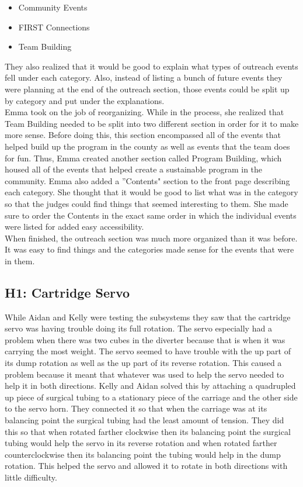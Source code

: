 \documentclass{article}
\begin{document}
\begin{itemize}
    \item Community Events
    \item FIRST Connections
    \item Team Building
\end{itemize}

They also realized that it would be good to explain what types of outreach events fell under each category. Also, instead of listing a bunch of future events they were planning at the end of the outreach section, those events could be split up by category and put under the explanations. \\

Emma took on the job of reorganizing. While in the process, she realized that Team Building needed to be split into two different section in order for it to make more sense. Before doing this, this section encompassed all of the events that helped build up the program in the county as well as events that the team does for fun. Thus, Emma created another section called Program Building, which housed all of the events that helped create a sustainable program in the community. Emma also added a ''Contents" section to the front page describing each category. She thought that it would be good to list what was in the category so that the judges could find things that seemed interesting to them. She made sure to order the Contents in the exact same order in which the individual events were listed for added easy accessibility. \\

When finished, the outreach section was much more organized than it was before. It was easy to find things and the categories made sense for the events that were in them. 
\subsection{H1: Cartridge Servo}

While Aidan and Kelly were testing the subsystems they saw that the cartridge servo was having trouble doing its full rotation. The servo especially had a problem when there was two cubes in the diverter because that is when it was carrying the most weight. The servo seemed to have trouble with the up part of its dump rotation as well as the up part of its reverse rotation. This caused a problem because it meant that whatever was used to help the servo needed to help it in both directions. Kelly and Aidan solved this by attaching a quadrupled up piece of surgical tubing to a stationary piece of the carriage and the other side to the servo horn. They connected it so that when the carriage was at its balancing point the surgical tubing had the least amount of tension. They did this so that when rotated farther clockwise then its balancing point the surgical tubing would help the servo in its reverse rotation and when rotated farther counterclockwise then its balancing point the tubing would help in the dump rotation. This helped the servo and allowed it to rotate in both directions with little difficulty.
\end{document}
